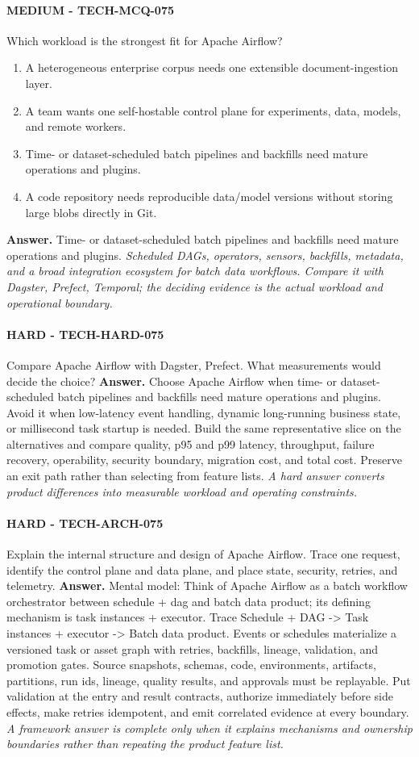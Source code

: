 \paragraph{MEDIUM - TECH-MCQ-075} Which workload is the strongest fit for Apache Airflow?
\begin{enumerate}[label=\Alph*.]
\item A heterogeneous enterprise corpus needs one extensible document-ingestion layer.
\item A team wants one self-hostable control plane for experiments, data, models, and remote workers.
\item Time- or dataset-scheduled batch pipelines and backfills need mature operations and plugins.
\item A code repository needs reproducible data/model versions without storing large blobs directly in Git.
\end{enumerate}
\textbf{Answer.} Time- or dataset-scheduled batch pipelines and backfills need mature operations and plugins.
\textit{Scheduled DAGs, operators, sensors, backfills, metadata, and a broad integration ecosystem for batch data workflows. Compare it with Dagster, Prefect, Temporal; the deciding evidence is the actual workload and operational boundary.}
\paragraph{HARD - TECH-HARD-075} Compare Apache Airflow with Dagster, Prefect. What measurements would decide the choice?
\textbf{Answer.} Choose Apache Airflow when time- or dataset-scheduled batch pipelines and backfills need mature operations and plugins. Avoid it when low-latency event handling, dynamic long-running business state, or millisecond task startup is needed. Build the same representative slice on the alternatives and compare quality, p95 and p99 latency, throughput, failure recovery, operability, security boundary, migration cost, and total cost. Preserve an exit path rather than selecting from feature lists.
\textit{A hard answer converts product differences into measurable workload and operating constraints.}
\paragraph{HARD - TECH-ARCH-075} Explain the internal structure and design of Apache Airflow. Trace one request, identify the control plane and data plane, and place state, security, retries, and telemetry.
\textbf{Answer.} Mental model: Think of Apache Airflow as a batch workflow orchestrator between schedule + dag and batch data product; its defining mechanism is task instances + executor. Trace Schedule + DAG -> Task instances + executor -> Batch data product. Events or schedules materialize a versioned task or asset graph with retries, backfills, lineage, validation, and promotion gates. Source snapshots, schemas, code, environments, artifacts, partitions, run ids, lineage, quality results, and approvals must be replayable. Put validation at the entry and result contracts, authorize immediately before side effects, make retries idempotent, and emit correlated evidence at every boundary.
\textit{A framework answer is complete only when it explains mechanisms and ownership boundaries rather than repeating the product feature list.}
